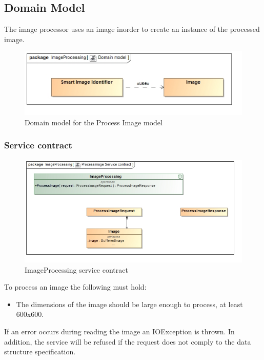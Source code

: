 \documentclass[a4paper,12pt]{report}
\begin{document}
	\FloatBarrier
	\subsection {Domain Model}
		The image processor uses an image inorder to create an instance of the processed image.
		\begin{figure}[htb]
			\centering
			\includegraphics [scale=0.5]{../Diagrams/ProcessImage_Domain_model.jpg}
			\caption{Domain model for the Process Image model}
		\end{figure}	

		\FloatBarrier
		\subsubsection {Service contract}
			\begin{figure}[htb]
				\centering
				\includegraphics [scale=0.5]{../Diagrams/ProcessImage_Service_contract.jpg}
				\caption{ImageProcessing service contract}
			\end{figure}	
			To process an image the following must hold:
			\begin {itemize}
				\item The dimensions of the image should be large enough to process, at least 600x600.
			\end {itemize}

			If an error occurs during reading the image an IOException is thrown. In addition, the service will be refused if the request does not comply to the data structure specification.
		
\end{document}
